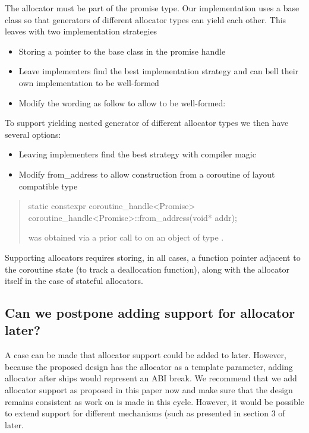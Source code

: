 \documentclass{wg21}
\begin{document}
The allocator must be part of the promise type.
Our implementation uses a base class so that generators of different allocator types can yield each other.
This leaves with two implementation strategies
\begin{itemize}
\item Storing a pointer to the base class in the promise handle
\item Leave implementers find the best implementation strategy and can bell their own implementation to be well-formed
\item Modify the wording as follow to allow  to be well-formed:
\end{itemize}

To support yielding nested generator of different allocator types we then have several options:
\begin{itemize}
\item Leaving implementers find the best strategy with compiler magic
\item Modify from_address to allow construction from a coroutine of layout compatible type
\end{itemize}
\begin{quote}
%
\begin{itemdecl}
static constexpr coroutine_handle<Promise> coroutine_handle<Promise>::from_address(void* addr);
\end{itemdecl}

\begin{itemdescr}
\expects
{} was obtained via a prior call to 
on an object of type \cv {}.
\end{itemdescr}
\end{quote}

Supporting allocators requires storing, in all cases, a function pointer adjacent to the coroutine state (to track a deallocation function),
along with the allocator itself in the case of stateful allocators.


\subsection{Can we postpone adding support for allocator later?}

A case can be made that allocator support could be added to  later.
However, because the proposed design has the allocator as a template parameter,
adding allocator after  ships would represent an ABI break.
We recommend that we add allocator support as proposed in this paper now and make sure that the design remains consistent as work on 
is made in this cycle.
However, it would be possible to extend support for different mechanisms (such as presented in section 3 of  later.
\end{document}
